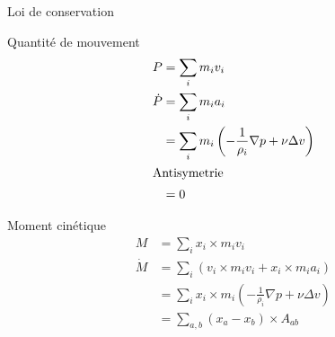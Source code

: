 \begin{frame}[shrink]{Loi de conservation}
\begin{block}{Quantité de mouvement}
 \begin{align*}
  P&=\sum_{i} m_iv_{i}\\
  \dot{P}&=\sum_{i} m_ia_{i}\\
  &=\sum_{i}m_{i} \left(-\frac{1}{\rho_{i}}\nabla p+\nu \Delta v\right)\\
  \intertext{Antisymetrie}
  &=0
 \end{align*}

\end{block}

\begin{block}{Moment cinétique}
 \begin{align*}
  M&=\sum_{i}x_{i}\times m_{i}v_{i}\\
  \dot{M}&=\sum_{i}\left(v_{i}\times m_{i}v_{i}+x_{i}\times m_{i}a_{i}\right)\\
  &=\sum_{i}x_{i}\times m_{i}\left(-\frac{1}{\rho_{i}}\nabla p+\nu \Delta v\right)\\
  &=\sum_{a,b}\left(x_{a}-x_{b}\right)\times A_{ab}
 \end{align*}

\end{block}

 
\end{frame}


